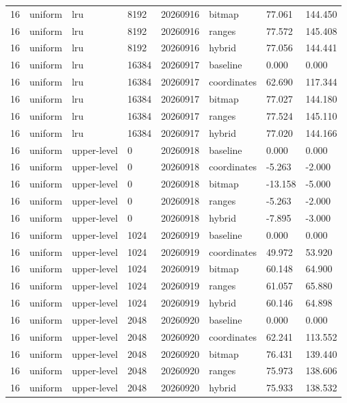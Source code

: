 \begin{tabular}{llllllll}
16 & uniform & lru & 8192 & 20260916 & bitmap & 77.061 & 144.450 \\
16 & uniform & lru & 8192 & 20260916 & ranges & 77.572 & 145.408 \\
16 & uniform & lru & 8192 & 20260916 & hybrid & 77.056 & 144.441 \\
16 & uniform & lru & 16384 & 20260917 & baseline & 0.000 & 0.000 \\
16 & uniform & lru & 16384 & 20260917 & coordinates & 62.690 & 117.344 \\
16 & uniform & lru & 16384 & 20260917 & bitmap & 77.027 & 144.180 \\
16 & uniform & lru & 16384 & 20260917 & ranges & 77.524 & 145.110 \\
16 & uniform & lru & 16384 & 20260917 & hybrid & 77.020 & 144.166 \\
16 & uniform & upper-level & 0 & 20260918 & baseline & 0.000 & 0.000 \\
16 & uniform & upper-level & 0 & 20260918 & coordinates & -5.263 & -2.000 \\
16 & uniform & upper-level & 0 & 20260918 & bitmap & -13.158 & -5.000 \\
16 & uniform & upper-level & 0 & 20260918 & ranges & -5.263 & -2.000 \\
16 & uniform & upper-level & 0 & 20260918 & hybrid & -7.895 & -3.000 \\
16 & uniform & upper-level & 1024 & 20260919 & baseline & 0.000 & 0.000 \\
16 & uniform & upper-level & 1024 & 20260919 & coordinates & 49.972 & 53.920 \\
16 & uniform & upper-level & 1024 & 20260919 & bitmap & 60.148 & 64.900 \\
16 & uniform & upper-level & 1024 & 20260919 & ranges & 61.057 & 65.880 \\
16 & uniform & upper-level & 1024 & 20260919 & hybrid & 60.146 & 64.898 \\
16 & uniform & upper-level & 2048 & 20260920 & baseline & 0.000 & 0.000 \\
16 & uniform & upper-level & 2048 & 20260920 & coordinates & 62.241 & 113.552 \\
16 & uniform & upper-level & 2048 & 20260920 & bitmap & 76.431 & 139.440 \\
16 & uniform & upper-level & 2048 & 20260920 & ranges & 75.973 & 138.606 \\
16 & uniform & upper-level & 2048 & 20260920 & hybrid & 75.933 & 138.532 \\

\end{tabular}
